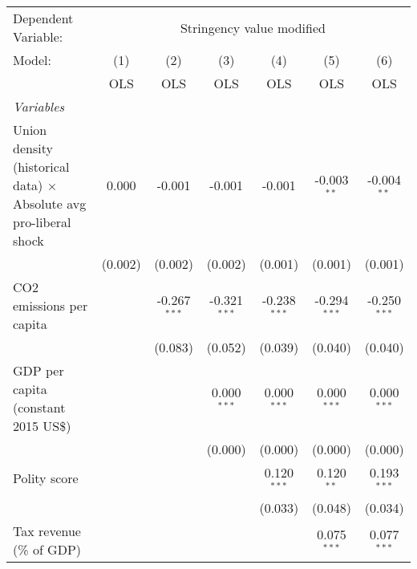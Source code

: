 
\begingroup
\centering
\begin{tabular}{lcccccc}
   \toprule
   Dependent Variable: & \multicolumn{6}{c}{Stringency value modified}\\
   Model:                                                                   & (1)     & (2)            & (3)            & (4)            & (5)            & (6)\\  
                                                                            &  OLS    & OLS            & OLS            & OLS            & OLS            & OLS\\  
   \midrule
   \emph{Variables}\\
   Union density (historical data) $\times$ Absolute avg pro-liberal shock  & 0.000   & -0.001         & -0.001         & -0.001         & -0.003$^{**}$  & -0.004$^{**}$\\   
                                                                            & (0.002) & (0.002)        & (0.002)        & (0.001)        & (0.001)        & (0.001)\\   
   CO2 emissions per capita                                                 &         & -0.267$^{***}$ & -0.321$^{***}$ & -0.238$^{***}$ & -0.294$^{***}$ & -0.250$^{***}$\\   
                                                                            &         & (0.083)        & (0.052)        & (0.039)        & (0.040)        & (0.040)\\   
   GDP per capita (constant 2015 US\$)                                      &         &                & 0.000$^{***}$  & 0.000$^{***}$  & 0.000$^{***}$  & 0.000$^{***}$\\   
                                                                            &         &                & (0.000)        & (0.000)        & (0.000)        & (0.000)\\   
   Polity score                                                             &         &                &                & 0.120$^{***}$  & 0.120$^{**}$   & 0.193$^{***}$\\   
                                                                            &         &                &                & (0.033)        & (0.048)        & (0.034)\\   
   Tax revenue (\% of GDP)                                                  &         &                &                &                & 0.075$^{***}$  & 0.077$^{***}$\\   

\end{tabular}
